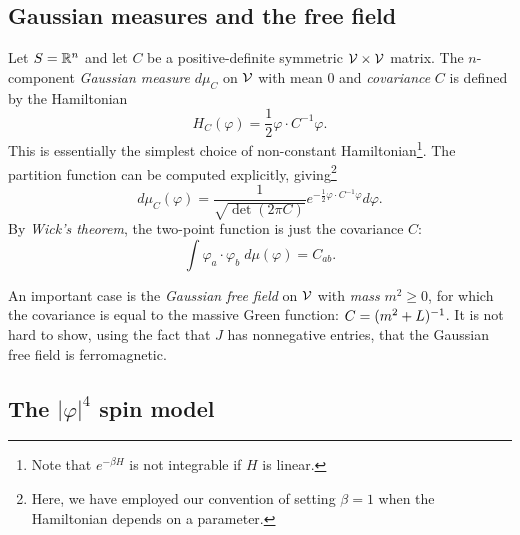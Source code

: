 
\subsection{Gaussian measures and the free field}

Let $S = {\mathbb R}^n$ and let $C$ be a positive-definite symmetric $\mathcal{V}\times\mathcal{V}$ matrix.
The $n$-component
\emph{Gaussian measure} $d\mu_C$ on $\mathcal{V}$ with mean $0$ and \emph{covariance} $C$ is defined
by the Hamiltonian
\begin{equation}
H_C(\varphi) = \frac{1}{2} \varphi \cdot C^{-1} \varphi.
\end{equation}
This is essentially the simplest choice of non-constant Hamiltonian\footnote{Note that
$e^{-\beta H}$ is not integrable if $H$ is linear.}.
The partition function can be computed explicitly, giving\footnote{Here, we have employed
our convention of setting $\beta = 1$ when the Hamiltonian depends on a parameter.}
\begin{equation}
d\mu_C(\varphi)
  =
\frac{1}{\sqrt{\det(2\pi C)}} e^{-\frac{1}{2} \varphi\cdot C^{-1}\varphi} d\varphi.
\end{equation}
By \emph{Wick's theorem}, the two-point function is just the covariance $C$:
\begin{equation}
\int \varphi_a \cdot \varphi_b \; d\mu(\varphi) = C_{ab}.
\end{equation}

An important case is the \emph{Gaussian free field} on $\mathcal{V}$ with \emph{mass} $m^2 \ge 0$,
for which the covariance is equal to the massive Green function: $C = (m^2 + L)^{-1}$.
It is not hard to show, using the fact that $J$ has nonnegative entries, that the Gaussian
free field is ferromagnetic.


\subsection{The \texorpdfstring{$|\varphi|^4$}{phi4} spin model}

